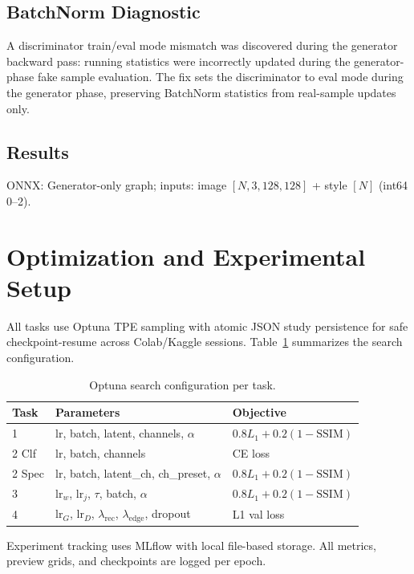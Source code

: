 \documentclass[conference]{IEEEtran}
\begin{document}
\subsection{BatchNorm Diagnostic}
A discriminator train/eval mode mismatch was discovered during the generator backward pass: running statistics were incorrectly updated during the generator-phase fake sample evaluation. The fix sets the discriminator to eval mode during the generator phase, preserving BatchNorm statistics from real-sample updates only.

\subsection{Results}
ONNX: Generator-only graph; inputs: image $[N,3,128,128]$ + style $[N]$ (int64 0--2).

\section{Optimization and Experimental Setup}

All tasks use Optuna TPE sampling with atomic JSON study persistence for safe checkpoint-resume across Colab/Kaggle sessions. Table~\ref{tab:optuna} summarizes the search configuration.

\begin{table}[h]
\centering
\caption{Optuna search configuration per task.}
\label{tab:optuna}
\begin{tabular}{@{}lp{3cm}l@{}}
\toprule
\textbf{Task} & \textbf{Parameters} & \textbf{Objective} \\
\midrule
1 & lr, batch, latent, channels, $\alpha$ & $0.8 L_1 + 0.2(1{-}\text{SSIM})$ \\
2 Clf & lr, batch, channels & CE loss \\
2 Spec & lr, batch, latent\_ch, ch\_preset, $\alpha$ & $0.8 L_1 + 0.2(1{-}\text{SSIM})$ \\
3 & lr$_w$, lr$_j$, $\tau$, batch, $\alpha$ & $0.8 L_1 + 0.2(1{-}\text{SSIM})$ \\
4 & lr$_G$, lr$_D$, $\lambda_{\text{rec}}$, $\lambda_{\text{edge}}$, dropout & L1 val loss \\
\bottomrule
\end{tabular}
\end{table}

Experiment tracking uses MLflow with local file-based storage. All metrics, preview grids, and checkpoints are logged per epoch.
\end{document}
